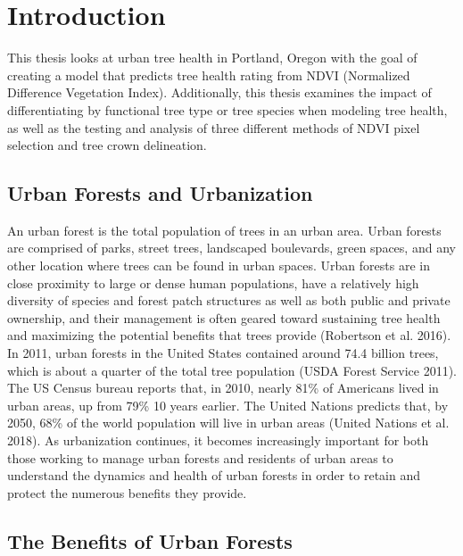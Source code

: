 \documentclass[12pt,twoside]{reedthesis}
\begin{document}
\hypertarget{intro}{%
\chapter{Introduction}\label{intro}}

This thesis looks at urban tree health in Portland, Oregon with the goal
of creating a model that predicts tree health rating from NDVI
(Normalized Difference Vegetation Index). Additionally, this thesis
examines the impact of differentiating by functional tree type or tree
species when modeling tree health, as well as the testing and analysis
of three different methods of NDVI pixel selection and tree crown
delineation.

\hypertarget{urban-forests-and-urbanization}{%
\section{Urban Forests and Urbanization}\label{urban-forests-and-urbanization}}

An urban forest is the total population of trees in an urban area. Urban
forests are comprised of parks, street trees, landscaped boulevards,
green spaces, and any other location where trees can be found in urban
spaces. Urban forests are in close proximity to large or dense human
populations, have a relatively high diversity of species and forest
patch structures as well as both public and private ownership, and their
management is often geared toward sustaining tree health and maximizing
the potential benefits that trees provide (Robertson et al. 2016). In 2011,
urban forests in the United States contained around 74.4 billion trees,
which is about a quarter of the total tree population
(USDA Forest Service 2011). The US Census bureau reports that, in 2010,
nearly 81\% of Americans lived in urban areas, up from 79\% 10 years
earlier. The United Nations predicts that, by 2050, 68\% of the world
population will live in urban areas (United Nations et al. 2018). As
urbanization continues, it becomes increasingly important for both those
working to manage urban forests and residents of urban areas to
understand the dynamics and health of urban forests in order to retain
and protect the numerous benefits they provide.

\hypertarget{the-benefits-of-urban-forests}{%
\section{The Benefits of Urban Forests}\label{the-benefits-of-urban-forests}}
\end{document}
